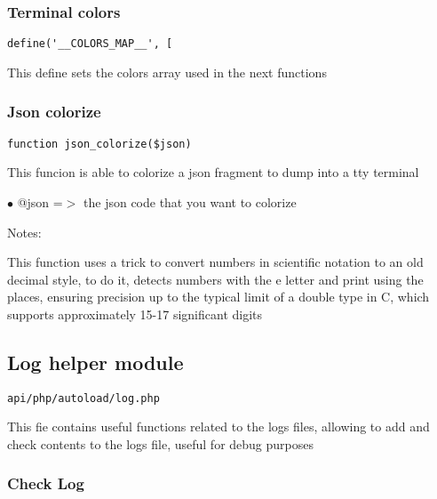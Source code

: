 \documentclass[a4paper]{article}
\begin{document}
\hypertarget{toc159}{}
\subsubsection{Terminal colors}

\begin{lstlisting}
define('__COLORS_MAP__', [
\end{lstlisting}

This define sets the colors array used in the next functions

\hypertarget{toc160}{}
\subsubsection{Json colorize}

\begin{lstlisting}
function json_colorize($json)
\end{lstlisting}

This funcion is able to colorize a json fragment to dump into a tty terminal

\begin{compactitem}
\item[\color{myblue}$\bullet$] @json =$>$ the json code that you want to colorize
\end{compactitem}

Notes:

This function uses a trick to convert numbers in scientific notation to an old
decimal style, to do it, detects numbers with the e letter and print using the
places, ensuring precision up to the typical limit of a double type in C, which
supports approximately 15-17 significant digits

\hypertarget{toc161}{}
\subsection{Log helper module}

\begin{lstlisting}
api/php/autoload/log.php
\end{lstlisting}

This fie contains useful functions related to the logs files, allowing to add and check contents
to the logs file, useful for debug purposes

\hypertarget{toc162}{}
\subsubsection{Check Log}
\end{document}
